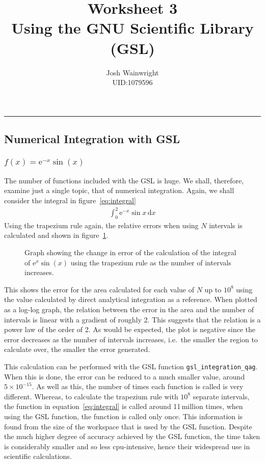 \documentclass[11pt]{article} %
\author{Josh Wainwright \\ UID:1079596}
\title{Worksheet 3 \\ Using the GNU Scientific Library (GSL)}
\date{}
\newcommand{\inputTikZ}[1]{%
  }
\newcommand{\inputTikZ}[1]{%
    \beginpgfgraphicnamed{#1-external}%
    \endpgfgraphicnamed%
  }
\renewcommand{\d}{\,\mathrm{d}} %
\newcommand{\e}[1]{\text{e}^{#1}} %
\newcommand{\code}[1]{\texttt{#1}}
\begin{document}
\maketitle
\tableofcontents
\vspace{1cm}\hrule \vspace{1cm}
	\setcounter{section}{2}

	\subsection{Numerical Integration with GSL}
	\subsubsection{$f(x) = \e{-x}\sin(x)$}
	The number of functions included with the GSL is huge. We shall, therefore, examine just a single topic, that of numerical integration. Again, we shall consider the integral in figure~\ref{eq:integral}
	\begin{align}
		\int_0^2 \e{-x}\sin{x}\d{x} \label{eq:integral}
	\end{align}
	Using the trapezium rule again, the relative errors when using $N$ intervals is calculated and shown in figure~\ref{fig:errorstrap}. 
	\begin{figure}[h]
		\centering
			\inputTikZ{Graph1}
		\caption{\label{fig:errorstrap}Graph showing the change in error of the calculation of the integral of $\e{x}\sin(x)$ using the trapezium rule as the number of intervals increases.}
	\end{figure}
	This shows the error for the area calculated for each value of $N$ up to $10^8$ using the value calculated by direct analytical integration as a reference. When plotted as a log-log graph, the relation between the error in the area and the number of intervals is linear with a gradient of roughly 2. This suggests that the relation is a power law of the order of 2. As would be expected, the plot is negative since the error decreases as the number of intervals increases, i.e.\ the smaller the region to calculate over, the smaller the error generated.

	This calculation can be performed with the GSL function \code{gsl\_integration\_qag}. When this is done, the error can be reduced to a much smaller value, around $5\times 10^{-15}$. As well as this, the number of times each function is called is very different. Whereas, to calculate the trapezium rule with $10^8$ separate intervals, the function in equation~\ref{eq:integral} is called around 11\,million times, when using the GSL function, the function is called only once. This information is found from the size of the workspace that is used by the GSL function. Despite the much higher degree of accuracy achieved by the GSL function, the time taken is considerably smaller and so less cpu-intensive, hence their widespread use in scientific calculations.
\end{document}
